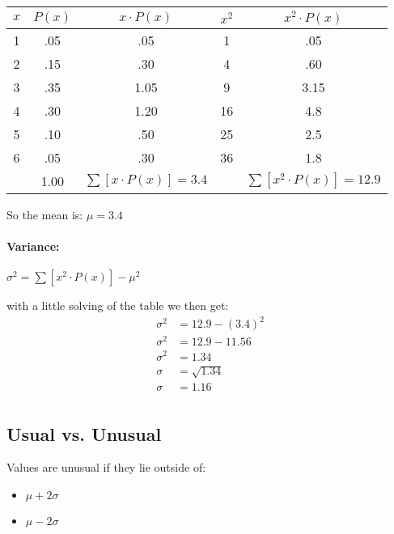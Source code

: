 \vspace{50pt}

\begin{table}[htbp]
    \centering
    \begin{tabular}{c|c|c|c|c}
        \toprule
        $x$ & $P(x)$ & $x \cdot P(x)$ & $x^2$ & $x^2 \cdot  P(x)$\\
        \midrule
        1 & .05 & .05 & 1  & .05   \\
        \midrule
        2 & .15 & .30 & 4  & .60   \\
        \midrule
        3 & .35 & 1.05 & 9  & 3.15   \\
        \midrule
        4 & .30 & 1.20 & 16 & 4.8   \\
        \midrule
        5 & .10 & .50 & 25 & 2.5  \\
        \midrule
        6 & .05 & .30 & 36 & 1.8   \\
        \midrule
          & 1.00 & $\sum[x\cdot P(x)]=3.4$ & & $\sum [x^2 \cdot P(x)]=12.9$\\
        \bottomrule
    \end{tabular}
\end{table}

So the mean is:
$\mu = 3.4$

\paragraph{Variance:}

$\sigma^2= \sum \left[  x^2 \cdot P(x) \right] -\mu^2 $

with a little solving of the table we then get:
\begin{align*}
\sigma^2 &= 12.9-(3.4)^2 \\
\sigma^2 &= 12.9-11.56 \\ 
\sigma^2 &= 1.34 \\
\sigma &=   \sqrt{1.34} \\
\sigma &= 1.16 \\
\end{align*}


\subsection{Usual vs. Unusual}
Values are unusual if they lie outside of:
\begin{itemize}
    \item $\mu + 2\sigma$
    \item $\mu - 2\sigma$
\end{itemize}

